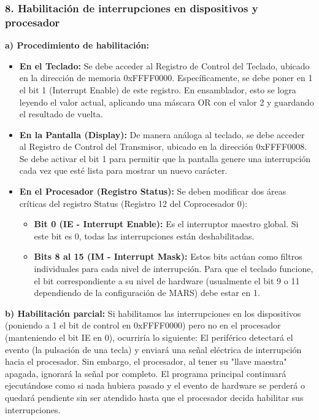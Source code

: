 \documentclass[12pt,a4paper]{article}
\begin{document}
\subsubsection{8. Habilitación de interrupciones en dispositivos y procesador}

\textbf{a) Procedimiento de habilitación:}
\begin{itemize}
    \item \textbf{En el Teclado:} Se debe acceder al Registro de Control del Teclado, ubicado en la dirección de memoria 0xFFFF0000. Específicamente, se debe poner en 1 el bit 1 (Interrupt Enable) de este registro. En ensamblador, esto se logra leyendo el valor actual, aplicando una máscara OR con el valor 2 y guardando el resultado de vuelta.
    \item \textbf{En la Pantalla (Display):} De manera análoga al teclado, se debe acceder al Registro de Control del Transmisor, ubicado en la dirección 0xFFFF0008. Se debe activar el bit 1 para permitir que la pantalla genere una interrupción cada vez que esté lista para mostrar un nuevo carácter.
    \item \textbf{En el Procesador (Registro Status):} Se deben modificar dos áreas críticas del registro Status (Registro 12 del Coprocesador 0):
    \begin{itemize}
        \item \textbf{Bit 0 (IE - Interrupt Enable):} Es el interruptor maestro global. Si este bit es 0, todas las interrupciones están deshabilitadas.
        \item \textbf{Bits 8 al 15 (IM - Interrupt Mask):} Estos bits actúan como filtros individuales para cada nivel de interrupción. Para que el teclado funcione, el bit correspondiente a su nivel de hardware (usualmente el bit 9 o 11 dependiendo de la configuración de MARS) debe estar en 1.
    \end{itemize}
\end{itemize}

\textbf{b) Habilitación parcial:} Si habilitamos las interrupciones en los dispositivos (poniendo a 1 el bit de control en 0xFFFF0000) pero no en el procesador (manteniendo el bit IE en 0), ocurriría lo siguiente: El periférico detectará el evento (la pulsación de una tecla) y enviará una señal eléctrica de interrupción hacia el procesador. Sin embargo, el procesador, al tener su "llave maestra" apagada, ignorará la señal por completo. El programa principal continuará ejecutándose como si nada hubiera pasado y el evento de hardware se perderá o quedará pendiente sin ser atendido hasta que el procesador decida habilitar sus interrupciones.
\end{document}
